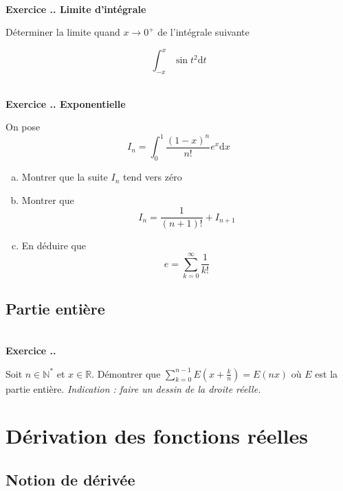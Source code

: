 \documentclass{article}
\newcommand{\di}{\mathrm{d}}
\newcommand{\mb}[1]{\mathbb{#1}}
\newcounter{exo}
\newcommand{\exercice}[1][\null]{\textbf{\\ Exercice \thesection.\theexo. #1} \addtocounter{exo}{1}}
\begin{document}
\exercice[Limite d'intégrale]

Déterminer la limite quand $x \to 0^+$ de l'intégrale suivante

\begin{equation*}
    \int_{-x}^x \sin t^2 \di t
\end{equation*}

\exercice[Exponentielle]

On pose 
\begin{equation*}
    I_n = \int_0^1 \frac{(1 - x)^n}{n!} e^x \di x
\end{equation*}

\begin{enumerate}[(a)]
    \item Montrer que la suite $I_n$ tend vers zéro
    \item Montrer que 
        \begin{equation*}
            I_n = \frac{1}{(n+1)!} + I_{n+1}
        \end{equation*}
    \item En déduire que 
        \begin{equation*}
            e = \sum_{k = 0}^\infty \frac{1}{k!}
        \end{equation*}
\end{enumerate}





\subsection{Partie entière}


\exercice

Soit $n \in \mb{N^*}$ et $x \in \mb{R}$. Démontrer que $\displaystyle \sum_{k=0}^{n-1} E\left(x + \frac{k}{n}\right) = E(nx)$ où  $E$ est la partie entière. \emph{Indication : faire un dessin de la droite réelle.}









\section{Dérivation des fonctions réelles}

\subsection{Notion de dérivée}
\end{document}
